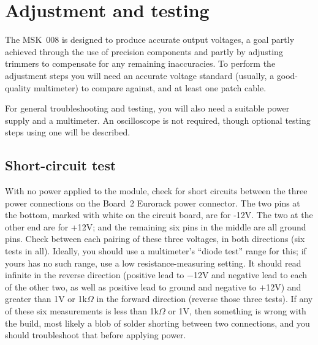 
%
%
%
%
%
%
\chapter{Adjustment and testing}

The MSK~008 is designed to produce accurate output voltages, a goal partly
achieved through the use of precision components and partly by adjusting
trimmers to compensate for any remaining inaccuracies.  To perform the
adjustment steps you will need an accurate voltage standard (usually, a
good-quality multimeter) to compare against, and at least one patch cable.

For general troubleshooting and testing, you will also need a suitable power
supply and a multimeter.  An oscilloscope is not required, though optional
testing steps using one will be described.

\section{Short-circuit test}

With no power applied to the module, check for short circuits between the
three power connections on the Board~2 Eurorack power connector.  The two
pins at the bottom, marked with white on the circuit board, are for -12V. 
The two at the other end are for +12V; and the remaining six pins in the
middle are all ground pins.  Check between each pairing of these three
voltages, in both directions (six tests in all).  Ideally, you should use a
multimeter's ``diode test'' range for this; if yours has no such range, use
a low resistance-measuring setting. It should read infinite in the reverse
direction (positive lead to $-$12V and negative lead to each of the other
two, as well as positive lead to ground and negative to $+$12V) and greater
than 1V or 1k$\Omega$ in the forward direction (reverse those three
tests).  If any of these six measurements is less than 1k$\Omega$ or 1V,
then something is wrong with the build, most likely a blob of solder
shorting between two connections, and you should troubleshoot that before
applying power.

